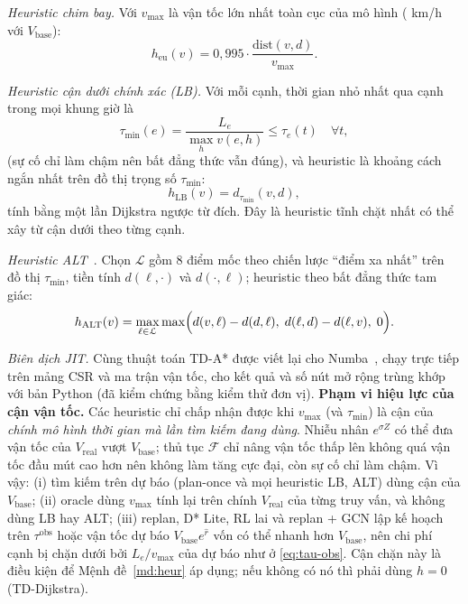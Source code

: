 \emph{Heuristic chim bay.} Với $v_{\max}$ là vận tốc lớn nhất toàn cục của mô hình (\VMaxGlobal{} km/h với $V_{\text{base}}$):
\begin{equation}
h_{\text{eu}}(v) = 0{,}995\cdot\frac{\text{dist}(v,d)}{v_{\max}}.
\label{eq:h-eu}
\end{equation}

\emph{Heuristic cận dưới chính xác (LB).} Với mỗi cạnh, thời gian nhỏ nhất qua cạnh trong mọi khung giờ là
\begin{equation}
\tau_{\min}(e) = \frac{L_e}{\max_{h} v(e,h)} \le \tau_e(t)\quad\forall t,
\label{eq:taumin}
\end{equation}
(sự cố chỉ làm chậm nên bất đẳng thức vẫn đúng), và heuristic là khoảng cách ngắn nhất trên đồ thị trọng số $\tau_{\min}$:
\begin{equation}
h_{\text{LB}}(v) = d_{\tau_{\min}}(v,d),
\label{eq:h-lb}
\end{equation}
tính bằng một lần Dijkstra ngược từ đích. Đây là heuristic tĩnh chặt nhất có thể xây từ cận dưới theo từng cạnh.

\emph{Heuristic ALT}~\cite{goldberg2005alt}. Chọn $\mathcal{L}$ gồm 8 điểm mốc theo chiến lược ``điểm xa nhất'' trên đồ
thị $\tau_{\min}$, tiền tính $d(\ell,\cdot)$ và $d(\cdot,\ell)$; heuristic theo bất đẳng thức tam giác:
\begin{equation}
h_{\text{ALT}}(v) = \max_{\ell\in\mathcal{L}} \max\Bigl(d(v,\ell)-d(d,\ell),\; d(\ell,d)-d(\ell,v),\; 0\Bigr).
\label{eq:h-alt}
\end{equation}

\emph{Biên dịch JIT.} Cùng thuật toán TD-A* được viết lại cho Numba~\cite{lam2015numba}, chạy trực tiếp trên mảng CSR và
ma trận vận tốc, cho kết quả và số nút mở rộng trùng khớp với bản Python (đã kiểm chứng bằng kiểm thử đơn vị).
\textbf{Phạm vi hiệu lực của cận vận tốc.} Các heuristic chỉ chấp nhận được khi $v_{\max}$ (và $\tau_{\min}$) là cận của
\emph{chính mô hình thời gian mà lần tìm kiếm đang dùng}. Nhiễu nhân $e^{\sigma Z}$ có thể đưa vận tốc của $V_{\text{real}}$
vượt $V_{\text{base}}$; thủ tục $\mathcal F$ chỉ nâng vận tốc thấp lên không quá vận tốc đầu mút cao hơn nên không làm tăng cực đại,
còn sự cố chỉ làm chậm. Vì vậy: (i) tìm kiếm trên dự báo (plan-once và mọi heuristic LB, ALT) dùng cận của $V_{\text{base}}$;
(ii) oracle dùng $v_{\max}$ tính lại trên chính $V_{\text{real}}$ của từng truy vấn, và không dùng LB hay ALT; (iii) replan, D* Lite,
RL lai và replan + GCN lập kế hoạch trên $\tau^{\text{obs}}$ hoặc vận tốc dự báo $V_{\text{base}}e^{\hat r}$ vốn có thể nhanh hơn
$V_{\text{base}}$, nên chi phí cạnh bị chặn dưới bởi $L_e/v_{\max}$ của dự báo như ở \eqref{eq:tau-obs}. Cận chặn này là điều kiện
để Mệnh đề~\ref{md:heur} áp dụng; nếu không có nó thì phải dùng $h=0$ (TD-Dijkstra).


